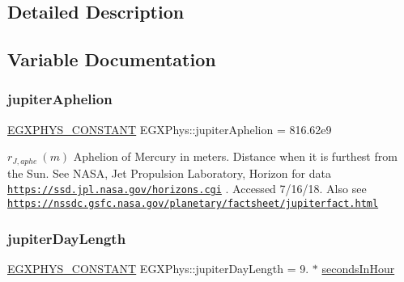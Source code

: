 \subsection{Detailed Description}


\subsection{Variable Documentation}
\mbox{\label{group___e_g_x_phys-_constants-_astrophysics-_solar_system-_jupiter-_orbit_ga8257f4e64891502c2027114ba8003fb6}} 
\subsubsection{\texorpdfstring{jupiter\+Aphelion}{jupiterAphelion}}
{\footnotesize\ttfamily \mbox{\hyperlink{group___e_g_x_phys-_constants-_macros_ga76980d288494ce1714c9ac68a95ba702}{E\+G\+X\+P\+H\+Y\+S\+\_\+\+C\+O\+N\+S\+T\+A\+NT}} E\+G\+X\+Phys\+::jupiter\+Aphelion = 816.\+62e9}

$ r_{J,aphe} \ (m)$ Aphelion of Mercury in meters. Distance when it is furthest from the Sun. See N\+A\+SA, Jet Propulsion Laboratory, Horizon for data \href{https://ssd.jpl.nasa.gov/horizons.cgi}{\tt https\+://ssd.\+jpl.\+nasa.\+gov/horizons.\+cgi} . Accessed 7/16/18. Also see \href{https://nssdc.gsfc.nasa.gov/planetary/factsheet/jupiterfact.html}{\tt https\+://nssdc.\+gsfc.\+nasa.\+gov/planetary/factsheet/jupiterfact.\+html} \mbox{\label{group___e_g_x_phys-_constants-_astrophysics-_solar_system-_jupiter-_orbit_ga9f7093c7f773b93f4155fb35a0d36665}} 
\subsubsection{\texorpdfstring{jupiter\+Day\+Length}{jupiterDayLength}}
{\footnotesize\ttfamily \mbox{\hyperlink{group___e_g_x_phys-_constants-_macros_ga76980d288494ce1714c9ac68a95ba702}{E\+G\+X\+P\+H\+Y\+S\+\_\+\+C\+O\+N\+S\+T\+A\+NT}} E\+G\+X\+Phys\+::jupiter\+Day\+Length = 9. $\ast$ \mbox{\hyperlink{namespace_e_g_x_phys_a7c3165cd93e36f1fb8e9fef80f117bef}{seconds\+In\+Hour}}}

